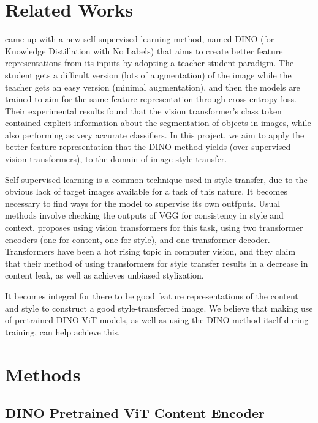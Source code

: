 \documentclass{article}
\begin{document}
\section{Related Works}

\cite{DINO} came up with a new self-supervised learning method, named DINO (for Knowledge Distillation with No Labels) that aims to create better feature representations from its inputs by adopting a teacher-student paradigm. The student gets a difficult version (lots of augmentation) of the image while the teacher gets an easy version (minimal augmentation), and then the models are trained to aim for the same feature representation through cross entropy loss. Their experimental results found that the vision transformer's class token contained explicit information about the segmentation of objects in images, while also performing as very accurate classifiers. In this project, we aim to apply the better feature representation that the DINO method yields (over supervised vision transformers), to the domain of image style transfer.

Self-supervised learning is a common technique used in style transfer, due to the obvious lack of target images available for a task of this nature. It becomes necessary to find ways for the model to supervise its own outfputs. Usual methods \cite{CNNStyleTransfer} involve checking the outputs of VGG for consistency in style and context. \cite{ImageStyleTransformer} proposes using vision transformers for this task, using two transformer encoders (one for content, one for style), and one transformer decoder. Transformers have been a hot rising topic in computer vision, and they claim that their method of using transformers for style transfer results in a decrease in content leak, as well as achieves unbiased stylization.

It becomes integral for there to be good feature representations of the content and style to construct a good style-transferred image. We believe that making use of pretrained DINO ViT models, as well as using the DINO method itself during training, can help achieve this.

\section{Methods}

\subsection{DINO Pretrained ViT Content Encoder}
\end{document}

